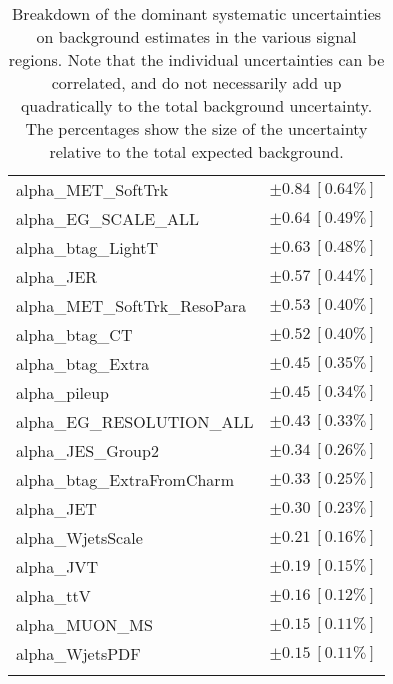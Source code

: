 \begin{table}
\begin{center}
\begin{tabular*}{\textwidth}{@{\extracolsep{\fill}}lc}
alpha\_MET\_SoftTrk         & $\pm 0.84\ [0.64\%] $       \\
alpha\_EG\_SCALE\_ALL         & $\pm 0.64\ [0.49\%] $       \\
alpha\_btag\_LightT         & $\pm 0.63\ [0.48\%] $       \\
alpha\_JER         & $\pm 0.57\ [0.44\%] $       \\
alpha\_MET\_SoftTrk\_ResoPara         & $\pm 0.53\ [0.40\%] $       \\
alpha\_btag\_CT         & $\pm 0.52\ [0.40\%] $       \\
alpha\_btag\_Extra         & $\pm 0.45\ [0.35\%] $       \\
alpha\_pileup         & $\pm 0.45\ [0.34\%] $       \\
alpha\_EG\_RESOLUTION\_ALL         & $\pm 0.43\ [0.33\%] $       \\
alpha\_JES\_Group2         & $\pm 0.34\ [0.26\%] $       \\
alpha\_btag\_ExtraFromCharm         & $\pm 0.33\ [0.25\%] $       \\
alpha\_JET         & $\pm 0.30\ [0.23\%] $       \\
alpha\_WjetsScale         & $\pm 0.21\ [0.16\%] $       \\
alpha\_JVT         & $\pm 0.19\ [0.15\%] $       \\
alpha\_ttV         & $\pm 0.16\ [0.12\%] $       \\
alpha\_MUON\_MS         & $\pm 0.15\ [0.11\%] $       \\
alpha\_WjetsPDF         & $\pm 0.15\ [0.11\%] $       \\
\noalign{\smallskip}\hline\noalign{\smallskip}
\end{tabular*}
\end{center}
\caption[Breakdown of uncertainty on background estimates]{
Breakdown of the dominant systematic uncertainties on background estimates in the various signal regions.
Note that the individual uncertainties can be correlated, and do not necessarily add up quadratically to 
the total background uncertainty. The percentages show the size of the uncertainty relative to the total expected background.
\label{table.results.bkgestimate.uncertainties.VRtt3onEM_cuts}}
\end{table}
%